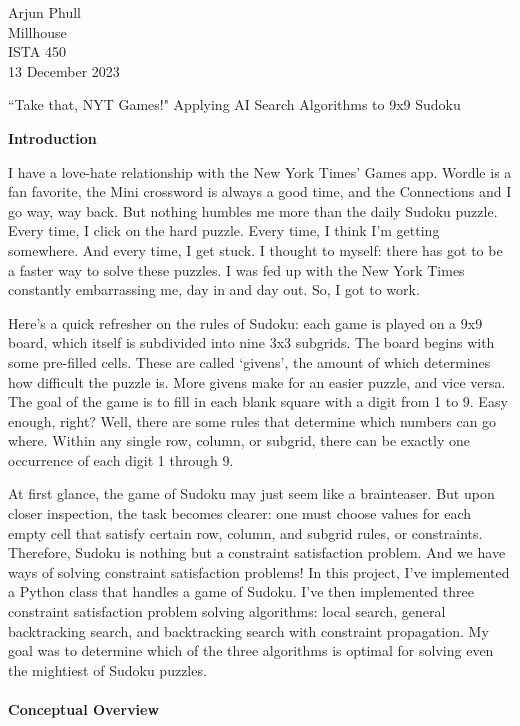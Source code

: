 \documentclass[12pt]{article}
\begin{document}
\begin{flushleft}
	Arjun Phull\\
	Millhouse\\
	ISTA 450\\
	13 December 2023
\end{flushleft}

\begin{center}
	``Take that, NYT Games!" Applying AI Search Algorithms to 9x9 Sudoku
\end{center}
\textbf{Introduction}

	I have a love-hate relationship with the New York Times' Games app. Wordle is a fan favorite, the Mini crossword is always a good time, and the Connections and I go way, way back. But nothing humbles me more than the daily Sudoku puzzle. Every time, I click on the hard puzzle. Every time, I think I'm getting somewhere. And every time, I get stuck. I thought to myself: there has got to be a faster way to solve these puzzles. I was fed up with the New York Times constantly embarrassing me, day in and day out. So, I got to work.

	Here's a quick refresher on the rules of Sudoku: each game is played on a 9x9 board, which itself is subdivided into nine 3x3 subgrids. The board begins with some pre-filled cells. These are called `givens', the amount of which determines how difficult the puzzle is. More givens make for an easier puzzle, and vice versa. The goal of the game is to fill in each blank square with a digit from 1 to 9. Easy enough, right? Well, there are some rules that determine which numbers can go where. Within any single row, column, or subgrid, there can be exactly one occurrence of each digit 1 through 9.
	
	At first glance, the game of Sudoku may just seem like a brainteaser. But upon closer inspection, the task becomes clearer: one must choose values for each empty cell that satisfy certain row, column, and subgrid rules, or constraints. Therefore, Sudoku is nothing but a constraint satisfaction problem. And we have ways of solving constraint satisfaction problems! In this project, I've implemented a Python class that handles a game of Sudoku. I've then implemented three constraint satisfaction problem solving algorithms: local search, general backtracking search, and backtracking search with constraint propagation. My goal was to determine which of the three algorithms is optimal for solving even the mightiest of Sudoku puzzles.\\\\
\textbf{Conceptual Overview}
\end{document}
